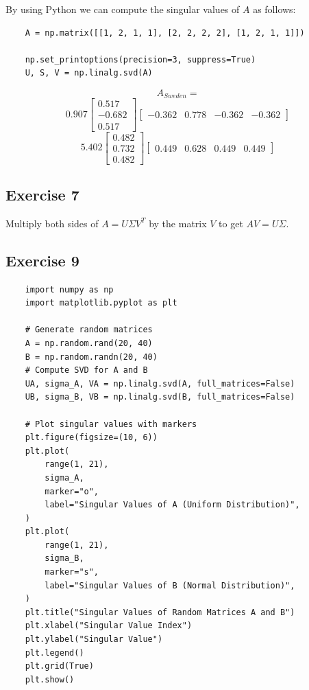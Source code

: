\documentclass{article}
\begin{document}
By using Python we can compute the singular values of $A$ as follows:
\begin{verbatim}
    A = np.matrix([[1, 2, 1, 1], [2, 2, 2, 2], [1, 2, 1, 1]])

    np.set_printoptions(precision=3, suppress=True)
    U, S, V = np.linalg.svd(A)
\end{verbatim}

\[
    A_{Sweden} =
\]
\[
    0.907
    \begin{bmatrix}
        0.517  \\
        -0.682 \\
        0.517
    \end{bmatrix}
    \begin{bmatrix}
        -0.362 & 0.778 & -0.362 & -0.362
    \end{bmatrix}\]
\[
    5.402
    \begin{bmatrix}
        0.482 \\
        0.732 \\
        0.482
    \end{bmatrix}
    \begin{bmatrix}
        0.449 & 0.628 & 0.449 & 0.449
    \end{bmatrix}
\]

\subsection{Exercise 7}
Multiply both sides of $A = U \Sigma V^{T}$ by the matrix $V$ to get $AV = U \Sigma$.

\subsection{Exercise 9}
\begin{verbatim}
    import numpy as np
    import matplotlib.pyplot as plt

    # Generate random matrices
    A = np.random.rand(20, 40)
    B = np.random.randn(20, 40)
    # Compute SVD for A and B
    UA, sigma_A, VA = np.linalg.svd(A, full_matrices=False)
    UB, sigma_B, VB = np.linalg.svd(B, full_matrices=False)

    # Plot singular values with markers
    plt.figure(figsize=(10, 6))
    plt.plot(
        range(1, 21),
        sigma_A,
        marker="o",
        label="Singular Values of A (Uniform Distribution)",
    )
    plt.plot(
        range(1, 21),
        sigma_B,
        marker="s",
        label="Singular Values of B (Normal Distribution)",
    )
    plt.title("Singular Values of Random Matrices A and B")
    plt.xlabel("Singular Value Index")
    plt.ylabel("Singular Value")
    plt.legend()
    plt.grid(True)
    plt.show()
\end{verbatim}
\end{document}
